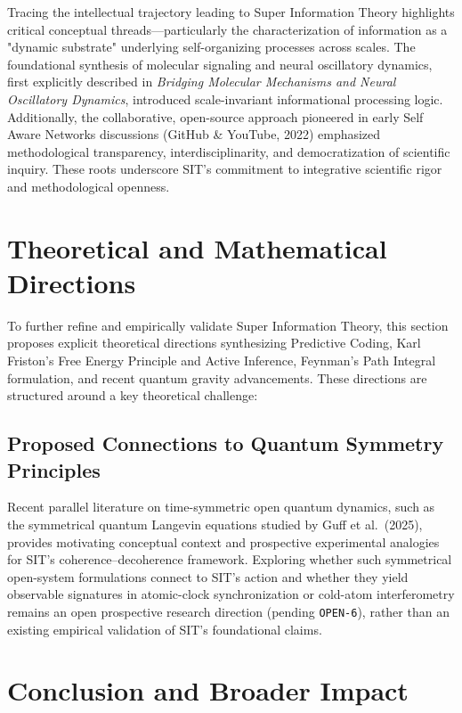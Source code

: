 Tracing the intellectual trajectory leading to Super Information Theory highlights critical conceptual threads---particularly the characterization of information as a "dynamic substrate" underlying self-organizing processes across scales. The foundational synthesis of molecular signaling and neural oscillatory dynamics, first explicitly described in \textit{Bridging Molecular Mechanisms and Neural Oscillatory Dynamics}, introduced scale-invariant informational processing logic. Additionally, the collaborative, open-source approach pioneered in early Self Aware Networks discussions (GitHub \& YouTube, 2022) emphasized methodological transparency, interdisciplinarity, and democratization of scientific inquiry. These roots underscore SIT's commitment to integrative scientific rigor and methodological openness.

\section{Theoretical and Mathematical Directions}

To further refine and empirically validate Super Information Theory, this section proposes explicit theoretical directions synthesizing Predictive Coding, Karl Friston's Free Energy Principle and Active Inference, Feynman's Path Integral formulation, and recent quantum gravity advancements. These directions are structured around a key theoretical challenge:

\subsection{Proposed Connections to Quantum Symmetry Principles}

Recent parallel literature on time-symmetric open quantum dynamics, such as the symmetrical quantum Langevin equations studied by Guff et al.~(2025), provides motivating conceptual context and prospective experimental analogies for SIT's coherence--decoherence framework. Exploring whether such symmetrical open-system formulations connect to SIT's action and whether they yield observable signatures in atomic-clock synchronization or cold-atom interferometry remains an open prospective research direction (pending \texttt{OPEN-6}), rather than an existing empirical validation of SIT's foundational claims.

\section{Conclusion and Broader Impact}
\label{sec:conclusion-impact}

